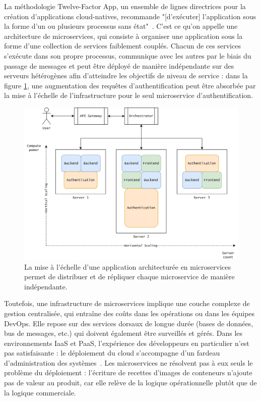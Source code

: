 La méthodologie Twelve-Factor App, un ensemble de lignes directrices pour la création d'applications cloud-natives, recommande "[d'exécuter] l'application sous la forme d'un ou plusieurs processus sans état"~\cite{12factor}. C'est ce qu'on appelle une architecture de microservices, qui consiste à organiser une application sous la forme d'une collection de services faiblement couplés. Chacun de ces services s'exécute dans son propre processus, communique avec les autres par le biais du passage de messages et peut être déployé de manière indépendante sur des serveurs hétérogènes afin d'atteindre les objectifs de niveau de service : dans la figure \ref{fig:scaling-microservices}, une augmentation des requêtes d'authentification peut être absorbée par la mise à l'échelle de l'infrastructure pour le seul microservice d'authentification.

\begin{figure}[ht]
    \centering
	\includegraphics[width=\textwidth]{2_Chapitre2/figures/scaling-microservices.png}
	\caption{La mise à l'échelle d'une application architecturée en microservices permet de distribuer et de répliquer chaque microservice de manière indépendante.}
	\label{fig:scaling-microservices}
\end{figure}

Toutefois, une infrastructure de microservices implique une couche complexe de gestion centralisée, qui entraîne des coûts dans les opérations ou dans les équipes DevOps. Elle repose sur des services dorsaux de longue durée (bases de données, bus de messages, etc.) qui doivent également être surveillés et gérés. Dans les environnements IaaS et PaaS, l'expérience des développeurs en particulier n'est pas satisfaisante : le déploiement du cloud s'accompagne d'un fardeau d'administration des systèmes~\cite{jonasCloudProgrammingSimplified2019}. Les microservices ne résolvent pas à eux seuls le problème du déploiement : l'écriture de recettes d'images de conteneurs n'ajoute pas de valeur au produit, car elle relève de la logique opérationnelle plutôt que de la logique commerciale.

